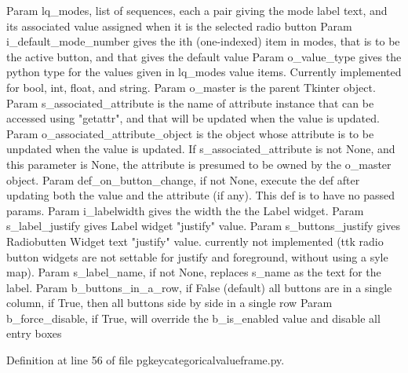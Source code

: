 \begin{DoxyVerb}Param lq_modes, list of sequences, each a pair
    giving the mode label text, and its associated value
    assigned when it is the selected radio button
Param i_default_mode_number gives the ith (one-indexed)
    item in modes, that is to be the active button,
    and that gives the default value
Param o_value_type gives the python type for the values
    given in lq_modes value items.  Currently implemented
    for bool, int, float, and string.
Param o_master is the parent Tkinter object.
Param s_associated_attribute is the name of 
    attribute instance that can be accessed
    using "getattr", and that will be
    updated when the value is updated.
Param o_associated_attribute_object is the object whose attribute
    is to be unpdated when the value is updated.  If
    s_associated_attribute is not None, and this parameter
    is None, the attribute is presumed to be
    owned by the o_master object.
Param def_on_button_change, if not None, execute the def
    after updating both the value and the attribute (if any).
    This def is to have no passed params.
Param i_labelwidth gives the width the the Label widget.
Param s_label_justify gives Label widget "justify" value.
Param s_buttons_justify gives Radiobutten Widget text "justify" value.
currently not implemented (ttk radio button widgets are not
settable for justify and foreground, without using a syle map).
Param s_label_name, if not None, replaces s_name as the text for the label.
Param b_buttons_in_a_row, if False (default) all buttons are in a single column, if True,
then all buttons side by side in a single row
Param b_force_disable, if True, will override the b_is_enabled value and disable all entry 
      boxes
\end{DoxyVerb}
 

Definition at line 56 of file pgkeycategoricalvalueframe.\+py.


